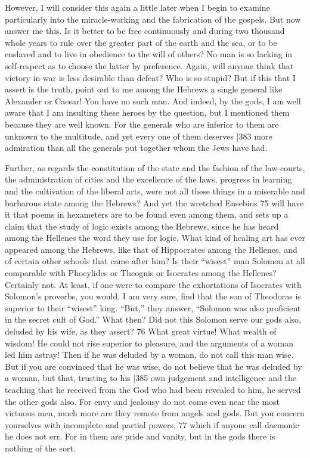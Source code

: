 However, I will consider this again a little later when I begin to examine particularly into the miracle-working and the fabrication of the gospels. But now answer me this. Is it better to be free continuously and during two thousand whole years to rule over the greater part of the earth and the sea, or to be enslaved and to live in obedience to the will of others? No man is so lacking in self-respect as to choose the latter by preference. Again, will anyone think that victory in war is less desirable than defeat? Who is so stupid? But if this that I assert is the truth, point out to me among the Hebrews a single general like Alexander or Caesar! You have no such man. And indeed, by the gods, I am well aware that I am insulting these heroes by the question, but I mentioned them because they are well known. For the generals who are inferior to them are unknown to the multitude, and yet every one of them deserves
|383 more admiration than all the generals put together whom the Jews have had.

Further, as regards the constitution of the state and the fashion of the law-courts, the administration of cities and the excellence of the laws, progress in learning and the cultivation of the liberal arts, were not all these things in a miserable and barbarous state among the Hebrews? And yet the wretched Eusebius
75 will have it that poems in hexameters are to be found even among them, and sets up a claim that the study of logic exists among the Hebrews, since he has heard among the Hellenes the word they use for logic. What kind of healing art has ever appeared among the Hebrews, like that of Hippocrates among the Hellenes, and of certain other schools that came after him? Is their ``wisest'' man Solomon at all comparable with Phocylides or Theognis or Isocrates among the Hellenes? Certainly not. At least, if one were to compare the exhortations of Isocrates with Solomon's proverbs, you would, I am very sure, find that the son of
Theodoras is superior to their ``wisest'' king. ``But,'' they answer, ``Solomon was also proficient in the secret cult of God.'' What then? Did not this Solomon serve our gods also, deluded by his wife, as they assert?
76 What great virtue! What wealth of wisdom! He could not rise superior to pleasure, and the arguments of a woman led him astray! Then if he was deluded by a woman, do not call this man wise. But if you are convinced that he was wise, do not believe that he was deluded by a woman, but that, trusting to his
|385 own judgement and intelligence and the teaching that he received from the God who had been revealed to him, he served the other gods also. For envy and jealousy do not come even near the most virtuous men, much more are they remote from angels and gods. But you concern yourselves with incomplete and partial powers, 77 which if anyone call daemonic he does not err. For in them are pride and vanity, but in the gods there is nothing of the sort.

